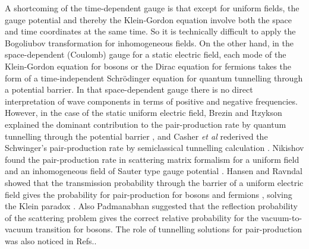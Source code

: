 \documentclass[a4paper,prd,showpacs,preprintnumbers,amsmath,amssymb]{revtex4}
\begin{document}
A shortcoming of the time-dependent gauge is that except for
uniform fields, the gauge potential and thereby the Klein-Gordon
equation involve both the space and time coordinates at the same
time. So it is technically difficult to apply the Bogoliubov
transformation for inhomogeneous fields. On the other hand, in the
space-dependent (Coulomb) gauge for a static electric field, each
mode of the Klein-Gordon equation for bosons or the Dirac equation
for fermions takes the form of a time-independent Schr\"{o}dinger
equation for quantum tunnelling through a potential barrier. In
that space-dependent gauge there is no direct interpretation of
wave components in terms of positive and negative frequencies.
However, in the case of the static uniform electric field, Brezin
and Itzykson explained the dominant contribution to the
pair-production rate by quantum tunnelling through the potential
barrier \cite{bre,itz}, and Casher {\it et al} rederived the
Schwinger's pair-production rate by semiclassical tunnelling
calculation \cite{neu,neu2,neu3}. Nikishov found the
pair-production rate in scattering matrix formalism for a uniform
field and an inhomogeneous field of Sauter type gauge potential
\cite{nik}. Hansen and Ravndal  showed that the transmission
probability through the barrier of a uniform electric field gives
the probability for pair-production for bosons and fermions
\cite{han}, solving the Klein paradox \cite{kle,hun,sau}. Also
Padmanabhan \cite{pad2} suggested that the reflection probability
of the scattering problem gives the correct relative probability
for the vacuum-to-vacuum transition for bosons. The role of
tunnelling solutions for pair-production was also noticed in
Refs.\cite{pop,ste,bro,bro2,pare}.
\end{document}
